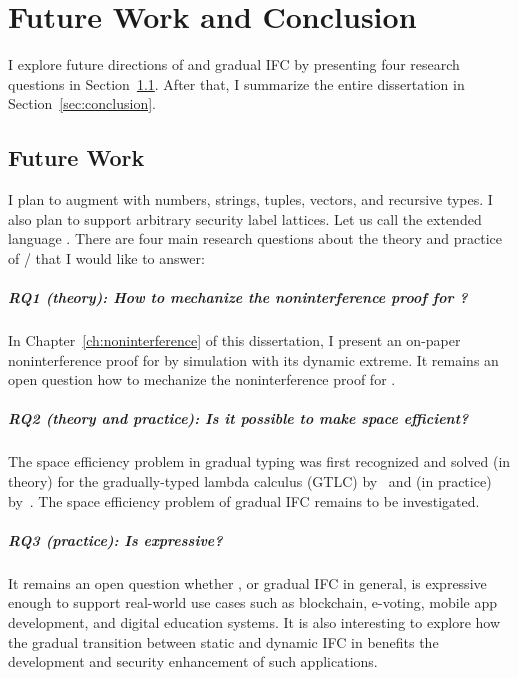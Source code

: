 \chapter{Future Work and Conclusion}
\label{ch:conclusion}

I explore future directions of \Surface and gradual IFC by presenting four
research questions in Section~\ref{sec:future}. After that, I summarize the
entire dissertation in Section~\ref{sec:conclusion}.

\section{Future Work}
\label{sec:future}

I plan to augment \Surface with numbers, strings, tuples, vectors, and recursive
types. I also plan to support arbitrary security label lattices. Let us call the
extended language \SurfacePlus. There are four main research questions about the
theory and practice of \Surface / \SurfacePlus that I would like to answer:

\paragraph{RQ1 (theory): How to mechanize the noninterference proof for \Surface?}
In Chapter~\ref{ch:noninterference} of this dissertation, I present an on-paper
noninterference proof for \Surface by simulation with its dynamic extreme. It
remains an open question how to mechanize the noninterference proof for
\Surface.

\paragraph{RQ2 (theory and practice): Is it possible to make \Surface space efficient?} The
space efficiency problem in gradual typing was first recognized and solved (in
theory) for the gradually-typed lambda calculus (GTLC)
by~\textcite{Herman:2006uq,Herman:2010aa} and (in practice)
by~\textcite{Kuhlenschmidt:2019aa}. The space efficiency problem of gradual IFC
remains to be investigated.

\paragraph{RQ3 (practice): Is \SurfacePlus expressive?} It remains an open
question whether \SurfacePlus, or gradual IFC in general, is expressive enough
to support real-world use cases such as blockchain, e-voting, mobile app
development, and digital education systems. It is also interesting to explore
how the gradual transition between static and dynamic IFC in \SurfacePlus
benefits the development and security enhancement of such applications.

